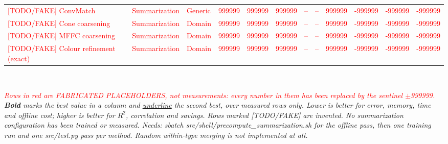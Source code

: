 \begin{table}[htbp]
{\begin{tabular}{lllrrrrrrrrr}
\textcolor{red}{{[TODO/FAKE] ConvMatch}} & \textcolor{red}{Summarization} & \textcolor{red}{Generic} & \textcolor{red}{999999} & \textcolor{red}{999999} & \textcolor{red}{999999} & \textcolor{red}{--} & \textcolor{red}{--} & \textcolor{red}{999999} & \textcolor{red}{-999999} & \textcolor{red}{-999999} & \textcolor{red}{-999999} \\
\textcolor{red}{{[TODO/FAKE] Cone coarsening}} & \textcolor{red}{Summarization} & \textcolor{red}{Domain} & \textcolor{red}{999999} & \textcolor{red}{999999} & \textcolor{red}{999999} & \textcolor{red}{--} & \textcolor{red}{--} & \textcolor{red}{999999} & \textcolor{red}{-999999} & \textcolor{red}{-999999} & \textcolor{red}{-999999} \\
\textcolor{red}{{[TODO/FAKE] MFFC coarsening}} & \textcolor{red}{Summarization} & \textcolor{red}{Domain} & \textcolor{red}{999999} & \textcolor{red}{999999} & \textcolor{red}{999999} & \textcolor{red}{--} & \textcolor{red}{--} & \textcolor{red}{999999} & \textcolor{red}{-999999} & \textcolor{red}{-999999} & \textcolor{red}{-999999} \\
\textcolor{red}{{[TODO/FAKE] Colour refinement (exact)}} & \textcolor{red}{Summarization} & \textcolor{red}{Domain} & \textcolor{red}{999999} & \textcolor{red}{999999} & \textcolor{red}{999999} & \textcolor{red}{--} & \textcolor{red}{--} & \textcolor{red}{999999} & \textcolor{red}{-999999} & \textcolor{red}{-999999} & \textcolor{red}{-999999} \\
\bottomrule
\end{tabular}
}
\\[4pt]\begin{minipage}{\linewidth}\footnotesize\emph{\textcolor{red}{Rows in red are FABRICATED PLACEHOLDERS, not measurements: every number in them has been replaced by the sentinel $\pm$999999.} \textbf{Bold} marks the best value in a column and \underline{underline} the second best, over measured rows only. Lower is better for error, memory, time and offline cost; higher is better for $R^2$, correlation and savings. Rows marked [TODO/FAKE] are invented. No summarization configuration has been trained or measured. Needs: sbatch src/shell/precompute\_summarization.sh for the offline pass, then one training run and one src/test.py pass per method. Random within-type merging is not implemented at all.}\end{minipage}
\end{table}
